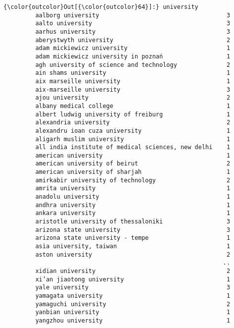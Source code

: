 \documentclass[11pt]{article}
\begin{document}
\begin{Verbatim}[commandchars=\\\{\}]
{\color{outcolor}Out[{\color{outcolor}64}]:} university
         aalborg university                                    3
         aalto university                                      3
         aarhus university                                     3
         aberystwyth university                                2
         adam mickiewicz university                            1
         adam mickiewicz university in poznań                  1
         agh university of science and technology              2
         ain shams university                                  1
         aix marseille university                              1
         aix-marseille university                              3
         ajou university                                       2
         albany medical college                                1
         albert ludwig university of freiburg                  1
         alexandria university                                 2
         alexandru ioan cuza university                        1
         aligarh muslim university                             1
         all india institute of medical sciences, new delhi    1
         american university                                   1
         american university of beirut                         2
         american university of sharjah                        1
         amirkabir university of technology                    2
         amrita university                                     1
         anadolu university                                    1
         andhra university                                     1
         ankara university                                     1
         aristotle university of thessaloniki                  3
         arizona state university                              3
         arizona state university - tempe                      1
         asia university, taiwan                               1
         aston university                                      2
                                                              ..
         xidian university                                     2
         xi’an jiaotong university                             1
         yale university                                       3
         yamagata university                                   1
         yamaguchi university                                  2
         yanbian university                                    1
         yangzhou university                                   1

\end{Verbatim}
\end{document}
